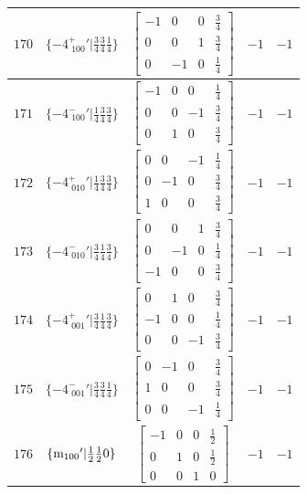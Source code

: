 \documentclass[fleqn,8pt]{jsarticle}
\begin{document}
\begin{longtable}{ccccc}
$ 170 $ & $ \{-4^{+}_{\,\,100}{}'|\frac{3}{4} \frac{3}{4} \frac{1}{4}\} $ & $ \begin{bmatrix} -1 & 0 & 0 & \frac{3}{4} \\ 0 & 0 & 1 & \frac{3}{4} \\ 0 & -1 & 0 & \frac{1}{4} \end{bmatrix} $ & $ -1 $ & $ -1 $ \\ \hline
$ 171 $ & $ \{-4^{-}_{\,\,100}{}'|\frac{1}{4} \frac{3}{4} \frac{3}{4}\} $ & $ \begin{bmatrix} -1 & 0 & 0 & \frac{1}{4} \\ 0 & 0 & -1 & \frac{3}{4} \\ 0 & 1 & 0 & \frac{3}{4} \end{bmatrix} $ & $ -1 $ & $ -1 $ \\ \hline
$ 172 $ & $ \{-4^{+}_{\,\,010}{}'|\frac{1}{4} \frac{3}{4} \frac{3}{4}\} $ & $ \begin{bmatrix} 0 & 0 & -1 & \frac{1}{4} \\ 0 & -1 & 0 & \frac{3}{4} \\ 1 & 0 & 0 & \frac{3}{4} \end{bmatrix} $ & $ -1 $ & $ -1 $ \\ \hline
$ 173 $ & $ \{-4^{-}_{\,\,010}{}'|\frac{3}{4} \frac{1}{4} \frac{3}{4}\} $ & $ \begin{bmatrix} 0 & 0 & 1 & \frac{3}{4} \\ 0 & -1 & 0 & \frac{1}{4} \\ -1 & 0 & 0 & \frac{3}{4} \end{bmatrix} $ & $ -1 $ & $ -1 $ \\ \hline
$ 174 $ & $ \{-4^{+}_{\,\,001}{}'|\frac{3}{4} \frac{1}{4} \frac{3}{4}\} $ & $ \begin{bmatrix} 0 & 1 & 0 & \frac{3}{4} \\ -1 & 0 & 0 & \frac{1}{4} \\ 0 & 0 & -1 & \frac{3}{4} \end{bmatrix} $ & $ -1 $ & $ -1 $ \\ \hline
$ 175 $ & $ \{-4^{-}_{\,\,001}{}'|\frac{3}{4} \frac{3}{4} \frac{1}{4}\} $ & $ \begin{bmatrix} 0 & -1 & 0 & \frac{3}{4} \\ 1 & 0 & 0 & \frac{3}{4} \\ 0 & 0 & -1 & \frac{1}{4} \end{bmatrix} $ & $ -1 $ & $ -1 $ \\ \hline
$ 176 $ & $ \{{\rm m}_{100}{}'|\frac{1}{2} \frac{1}{2} 0\} $ & $ \begin{bmatrix} -1 & 0 & 0 & \frac{1}{2} \\ 0 & 1 & 0 & \frac{1}{2} \\ 0 & 0 & 1 & 0 \end{bmatrix} $ & $ -1 $ & $ -1 $ \\ \hline

\end{longtable}
\end{document}
